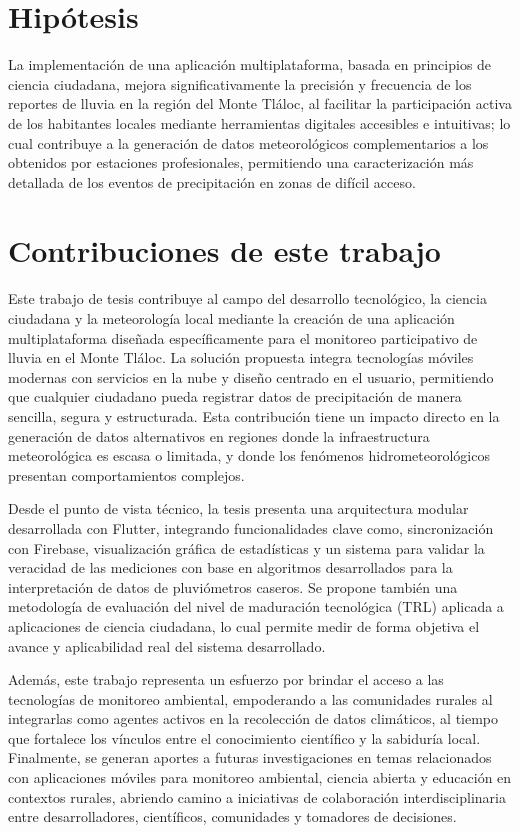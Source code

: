\section{Hipótesis}

La implementación de una aplicación multiplataforma, basada en principios de ciencia ciudadana, mejora significativamente la precisión y frecuencia de los reportes de lluvia en la región del Monte Tláloc, al facilitar la participación activa de los habitantes locales mediante herramientas digitales accesibles e intuitivas; lo cual contribuye a la generación de datos meteorológicos complementarios a los obtenidos por estaciones profesionales, permitiendo una caracterización más detallada de los eventos de precipitación en zonas de difícil acceso.



\section{Contribuciones de este trabajo}

Este trabajo de tesis contribuye al campo del desarrollo tecnológico, la ciencia ciudadana y la meteorología local mediante la creación de una aplicación multiplataforma diseñada específicamente para el monitoreo participativo de lluvia en el Monte Tláloc. La solución propuesta integra tecnologías móviles modernas con servicios en la nube y diseño centrado en el usuario, permitiendo que cualquier ciudadano pueda registrar datos de precipitación de manera sencilla, segura y estructurada. Esta contribución tiene un impacto directo en la generación de datos alternativos en regiones donde la infraestructura meteorológica es escasa o limitada, y donde los fenómenos hidrometeorológicos presentan comportamientos complejos.

Desde el punto de vista técnico, la tesis presenta una arquitectura modular desarrollada con Flutter, integrando funcionalidades clave como, sincronización con Firebase, visualización gráfica de estadísticas y un sistema para validar la veracidad de las mediciones con base en algoritmos desarrollados para la interpretación de datos de pluviómetros caseros. Se propone también una metodología de evaluación del nivel de maduración tecnológica (TRL) aplicada a aplicaciones de ciencia ciudadana, lo cual permite medir de forma objetiva el avance y aplicabilidad real del sistema desarrollado.

Además, este trabajo representa un esfuerzo por brindar el acceso a las tecnologías de monitoreo ambiental, empoderando a las comunidades rurales al integrarlas como agentes activos en la recolección de datos climáticos, al tiempo que fortalece los vínculos entre el conocimiento científico y la sabiduría local. Finalmente, se generan aportes a futuras investigaciones en temas relacionados con aplicaciones móviles para monitoreo ambiental, ciencia abierta y educación en contextos rurales, abriendo camino a iniciativas de colaboración interdisciplinaria entre desarrolladores, científicos, comunidades y tomadores de decisiones.


